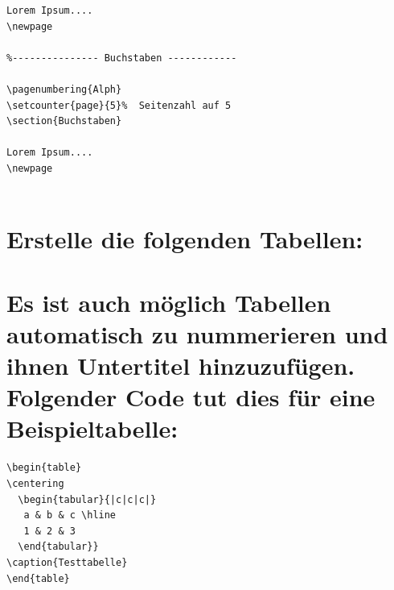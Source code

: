 \begin{Antwort}
\begin{lstlisting}[style=latex]
Lorem Ipsum....
\newpage

%--------------- Buchstaben ------------

\pagenumbering{Alph}
\setcounter{page}{5}%  Seitenzahl auf 5
\section{Buchstaben}

Lorem Ipsum....
\newpage


\end{lstlisting}

\end{Antwort}

\newpage



\section{Erstelle die folgenden Tabellen:}
\section{Es ist auch möglich Tabellen automatisch zu nummerieren und ihnen Untertitel hinzuzufügen. Folgender Code tut dies für eine Beispieltabelle:}
\begin{lstlisting}
\begin{table}
\centering
  \begin{tabular}{|c|c|c|} 
   a & b & c \hline
   1 & 2 & 3
  \end{tabular}}
\caption{Testtabelle}
\end{table}
\end{lstlisting}

